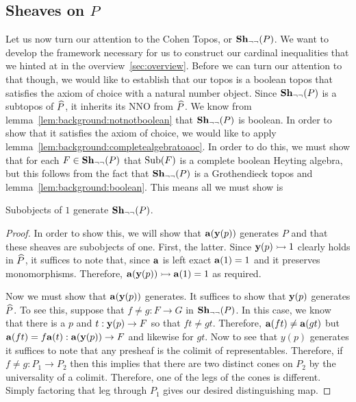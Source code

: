 \subsection{Sheaves on \texorpdfstring{$P$}{P}}\label{subsec:presheaves}\hfill

Let us now turn our attention to the Cohen Topos, or
$\sheaves[\neg\neg]{P}$. We want to develop the framework necessary
for us to construct our cardinal inequalities that we hinted at in the
overview~\ref{sec:overview}. Before we can turn our attention to that
though, we would like to establish that our topos is a boolean topos
that satisfies the axiom of choice with a natural number object. Since
$\sheaves[\neg\neg]{P}$ is a subtopos of $\presheaf{P}$, it inherits
its NNO from $\presheaf{P}$. We know from
lemma~\ref{lem:background:notnotboolean} that $\sheaves[\neg\neg]{P}$
is boolean. In order to show that it satisfies the axiom of choice, we
would like to apply
lemma~\ref{lem:background:completealgebratoaoc}. In order to do this,
we must show that for each $F \in \sheaves[\neg\neg]{P}$ that
$\sub(F)$ is a complete boolean Heyting algebra, but this follows from
the fact that $\sheaves[\neg\neg]{P}$ is a Grothendieck topos and
lemma~\ref{lem:background:boolean}. This means all we must show is

\begin{lem}
  Subobjects of $1$ generate $\sheaves[\neg\neg]{P}$.
\end{lem}
\begin{proof}
  In order to show this, we will show that $\sheafify(\yoneda(p))$
  generates $P$ and that these sheaves are subobjects of one. First,
  the latter. Since $\yoneda(p) \mono 1$ clearly holds in $\presheaf{P}$, it
  suffices to note that, since $\sheafify$ is left exact
  $\sheafify(1) = 1$ and it preserves monomorphisms. Therefore,
  $\sheafify(\yoneda(p)) \mono \sheafify(1) = 1$ as required.

  Now we must show that $\sheafify(\yoneda(p))$ generates. It suffices
  to show that $\yoneda(p)$ generates $\presheaf{P}$. To see this,
  suppose that $f \neq g : F \to G$ in $\sheaves[\neg\neg]{P}$. In
  this case, we know that there is a $p$ and $t : \yoneda(p) \to F$ so
  that $ft \neq gt$. Therefore, $\sheafify(ft) \neq \sheafify(gt)$ but
  $\sheafify(ft) = f\sheafify(t) : \sheafify(\yoneda(p)) \to F$ and
  likewise for $gt$. Now to see that $y(p)$ generates it suffices to
  note that any presheaf is the colimit of representables. Therefore,
  if $f \neq g : P_1 \to P_2$ then this implies that there are two
  distinct cones on $P_2$ by the universality of a colimit. Therefore,
  one of the legs of the cones is different. Simply factoring that leg
  through $P_1$ gives our desired distinguishing map.
\end{proof}


